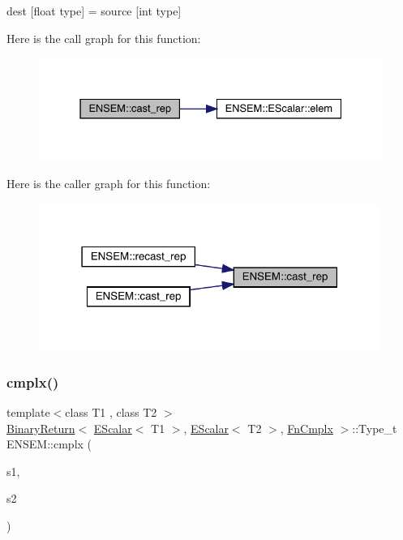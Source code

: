 dest \mbox{[}float type\mbox{]} = source \mbox{[}int type\mbox{]} 

Here is the call graph for this function\+:\nopagebreak
\begin{figure}[H]
\begin{center}
\leavevmode
\includegraphics[width=331pt]{d4/dca/group__escalar_ga1fe36c2ff072b322fac723a4e44f6584_cgraph}
\end{center}
\end{figure}
Here is the caller graph for this function\+:\nopagebreak
\begin{figure}[H]
\begin{center}
\leavevmode
\includegraphics[width=316pt]{d4/dca/group__escalar_ga1fe36c2ff072b322fac723a4e44f6584_icgraph}
\end{center}
\end{figure}
\mbox{\label{group__escalar_gaccbb7d66b912e8f0972f4e50095f296e}} 
\subsubsection{\texorpdfstring{cmplx()}{cmplx()}}
{\footnotesize\ttfamily template$<$class T1 , class T2 $>$ \\
\mbox{\hyperlink{structENSEM_1_1BinaryReturn}{Binary\+Return}}$<$ \mbox{\hyperlink{classENSEM_1_1EScalar}{E\+Scalar}}$<$ T1 $>$, \mbox{\hyperlink{classENSEM_1_1EScalar}{E\+Scalar}}$<$ T2 $>$, \mbox{\hyperlink{structENSEM_1_1FnCmplx}{Fn\+Cmplx}} $>$\+::Type\+\_\+t E\+N\+S\+E\+M\+::cmplx (\begin{DoxyParamCaption}\item[{const \mbox{\hyperlink{classENSEM_1_1EScalar}{E\+Scalar}}$<$ T1 $>$ \&}]{s1,  }\item[{const \mbox{\hyperlink{classENSEM_1_1EScalar}{E\+Scalar}}$<$ T2 $>$ \&}]{s2 }\end{DoxyParamCaption})\hspace{0.3cm}{\ttfamily [inline]}}



